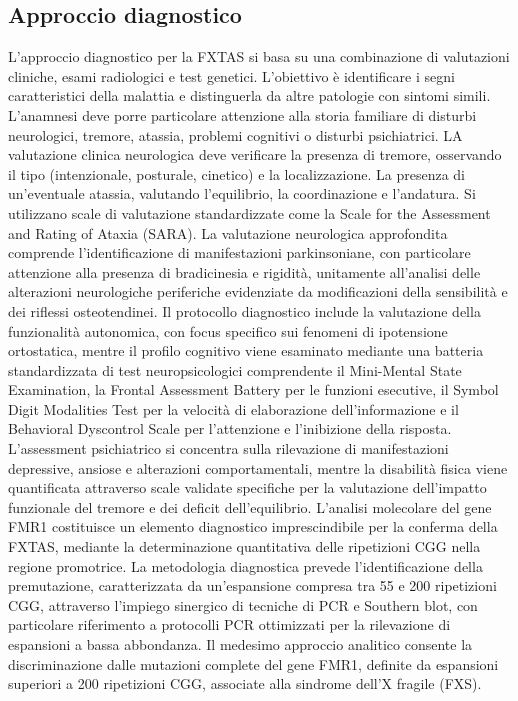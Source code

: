 \subsection{Approccio diagnostico}
L'approccio diagnostico per la FXTAS si basa su una combinazione di valutazioni cliniche, esami radiologici e test genetici. L'obiettivo è identificare i segni caratteristici della malattia e distinguerla da altre patologie con sintomi simili.
L'anamnesi deve porre particolare attenzione alla storia familiare di disturbi neurologici, tremore, atassia, problemi cognitivi o disturbi psichiatrici. LA valutazione clinica neurologica deve verificare la presenza di tremore, osservando il tipo (intenzionale, posturale, cinetico) e la localizzazione. La presenza di un'eventuale atassia, valutando l'equilibrio, la coordinazione e l'andatura. Si utilizzano scale di valutazione standardizzate come la Scale for the Assessment and Rating of Ataxia (SARA).
La valutazione neurologica approfondita comprende l'identificazione di manifestazioni parkinsoniane, con particolare attenzione alla presenza di bradicinesia e rigidità, unitamente all'analisi delle alterazioni neurologiche periferiche evidenziate da modificazioni della sensibilità e dei riflessi osteotendinei. Il protocollo diagnostico include la valutazione della funzionalità autonomica, con focus specifico sui fenomeni di ipotensione ortostatica, mentre il profilo cognitivo viene esaminato mediante una batteria standardizzata di test neuropsicologici comprendente il Mini-Mental State Examination, la Frontal Assessment Battery per le funzioni esecutive, il Symbol Digit Modalities Test per la velocità di elaborazione dell'informazione e il Behavioral Dyscontrol Scale per l'attenzione e l'inibizione della risposta. L'assessment psichiatrico si concentra sulla rilevazione di manifestazioni depressive, ansiose e alterazioni comportamentali, mentre la disabilità fisica viene quantificata attraverso scale validate specifiche per la valutazione dell'impatto funzionale del tremore e dei deficit dell'equilibrio.
L'analisi molecolare del gene FMR1 costituisce un elemento diagnostico imprescindibile per la conferma della FXTAS, mediante la determinazione quantitativa delle ripetizioni CGG nella regione promotrice. La metodologia diagnostica prevede l'identificazione della premutazione, caratterizzata da un'espansione compresa tra 55 e 200 ripetizioni CGG, attraverso l'impiego sinergico di tecniche di PCR e Southern blot, con particolare riferimento a protocolli PCR ottimizzati per la rilevazione di espansioni a bassa abbondanza. Il medesimo approccio analitico consente la discriminazione dalle mutazioni complete del gene FMR1, definite da espansioni superiori a 200 ripetizioni CGG, associate alla sindrome dell'X fragile (FXS).
